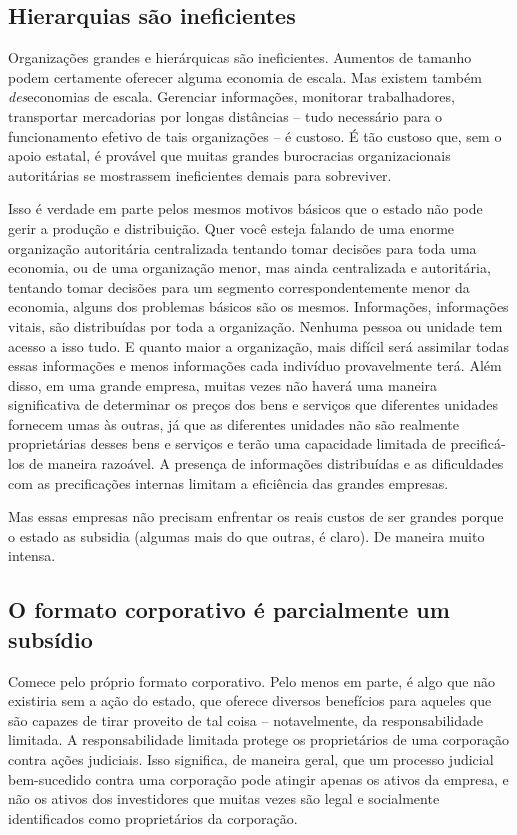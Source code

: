 \subsection*{Hierarquias são ineficientes}

Organizações grandes e hierárquicas são ineficientes. Aumentos de tamanho podem certamente oferecer alguma economia de escala. Mas existem também \emph{des}economias de escala. Gerenciar informações, monitorar trabalhadores, transportar mercadorias por longas distâncias -- tudo necessário para o funcionamento efetivo de tais organizações -- é custoso. É tão custoso que, sem o apoio estatal, é provável que muitas grandes burocracias organizacionais autoritárias se mostrassem ineficientes demais para sobreviver.

Isso é verdade em parte pelos mesmos motivos básicos que o estado não pode gerir a produção e distribuição. Quer você esteja falando de uma enorme organização autoritária centralizada tentando tomar decisões para toda uma economia, ou de uma organização menor, mas ainda centralizada e autoritária, tentando tomar decisões para um segmento correspondentemente menor da economia, alguns dos problemas básicos são os mesmos. Informações, informações vitais, são distribuídas por toda a organização. Nenhuma pessoa ou unidade tem acesso a isso tudo. E quanto maior a organização, mais difícil será assimilar todas essas informações e menos informações cada indivíduo provavelmente terá. Além disso, em uma grande empresa, muitas vezes não haverá uma maneira significativa de determinar os preços dos bens e serviços que diferentes unidades fornecem umas às outras, já que as diferentes unidades não são realmente proprietárias desses bens e serviços e terão uma capacidade limitada de precificá-los de maneira razoável. A presença de informações distribuídas e as dificuldades com as precificações internas limitam a eficiência das grandes empresas.

Mas essas empresas não precisam enfrentar os reais custos de ser grandes porque o estado as subsidia (algumas mais do que outras, é claro). De maneira muito intensa.

\subsection*{O formato corporativo é parcialmente um subsídio}

Comece pelo próprio formato corporativo. Pelo menos em parte, é algo que não existiria sem a ação do estado, que oferece diversos benefícios para aqueles que são capazes de tirar proveito de tal coisa -- notavelmente, da responsabilidade limitada. A responsabilidade limitada protege os proprietários de uma corporação contra ações judiciais. Isso significa, de maneira geral, que um processo judicial bem-sucedido contra uma corporação pode atingir apenas os ativos da empresa, e não os ativos dos investidores que muitas vezes são legal e socialmente identificados como proprietários da corporação.

